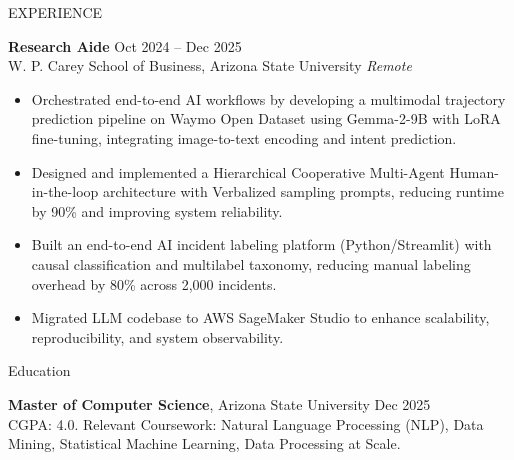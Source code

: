 \documentclass{resume} %
\begin{document}
\begin{rSection}{EXPERIENCE}

\textbf{Research Aide} \hfill Oct 2024 -- Dec 2025\\
W. P. Carey School of Business, Arizona State University \hfill \textit{Remote}
 \begin{itemize}
    \itemsep -3pt {}
     \item Orchestrated end-to-end AI workflows by developing a multimodal trajectory prediction pipeline on Waymo Open Dataset using Gemma-2-9B with LoRA fine-tuning, integrating image-to-text encoding and intent prediction.
     \item Designed and implemented a Hierarchical Cooperative Multi-Agent Human-in-the-loop architecture with Verbalized sampling prompts, reducing runtime by 90\% and improving system reliability.
     \item Built an end-to-end AI incident labeling platform (Python/Streamlit) with causal classification and multilabel taxonomy, reducing manual labeling overhead by 80\% across 2,000 incidents.
     \item Migrated LLM codebase to AWS SageMaker Studio to enhance scalability, reproducibility, and system observability.
 \end{itemize}

\end{rSection}


\begin{rSection}{Education}

{\bf Master of Computer Science}, Arizona State University \hfill {Dec 2025}\\
CGPA: 4.0. Relevant Coursework: Natural Language Processing (NLP), Data Mining, Statistical Machine Learning, Data Processing at Scale.

\end{rSection}
\vspace{-5 pt}
\end{document}
